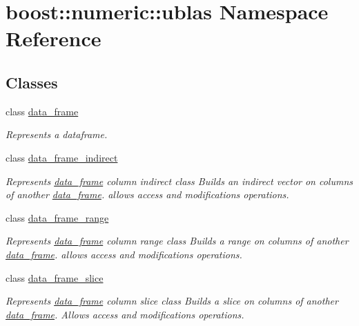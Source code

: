 \hypertarget{namespaceboost_1_1numeric_1_1ublas}{}\section{boost\+:\+:numeric\+:\+:ublas Namespace Reference}
\label{namespaceboost_1_1numeric_1_1ublas}
\subsection*{Classes}
\begin{DoxyCompactItemize}
\item 
class \hyperlink{classboost_1_1numeric_1_1ublas_1_1data__frame}{data\+\_\+frame}
\begin{DoxyCompactList}\small\item\em Represents a dataframe. \end{DoxyCompactList}\item 
class \hyperlink{classboost_1_1numeric_1_1ublas_1_1data__frame__indirect}{data\+\_\+frame\+\_\+indirect}
\begin{DoxyCompactList}\small\item\em Represents \hyperlink{classboost_1_1numeric_1_1ublas_1_1data__frame}{data\+\_\+frame} column indirect class Builds an indirect vector on columns of another \hyperlink{classboost_1_1numeric_1_1ublas_1_1data__frame}{data\+\_\+frame}. allows access and modifications operations. \end{DoxyCompactList}\item 
class \hyperlink{classboost_1_1numeric_1_1ublas_1_1data__frame__range}{data\+\_\+frame\+\_\+range}
\begin{DoxyCompactList}\small\item\em Represents \hyperlink{classboost_1_1numeric_1_1ublas_1_1data__frame}{data\+\_\+frame} column range class Builds a range on columns of another \hyperlink{classboost_1_1numeric_1_1ublas_1_1data__frame}{data\+\_\+frame}. allows access and modifications operations. \end{DoxyCompactList}\item 
class \hyperlink{classboost_1_1numeric_1_1ublas_1_1data__frame__slice}{data\+\_\+frame\+\_\+slice}
\begin{DoxyCompactList}\small\item\em Represents \hyperlink{classboost_1_1numeric_1_1ublas_1_1data__frame}{data\+\_\+frame} column slice class Builds a slice on columns of another \hyperlink{classboost_1_1numeric_1_1ublas_1_1data__frame}{data\+\_\+frame}. Allows access and modifications operations. \end{DoxyCompactList}\item 

\end{DoxyCompactItemize}
